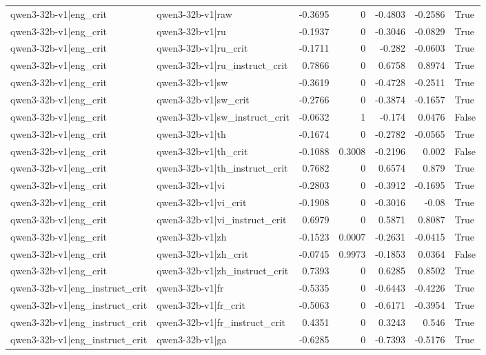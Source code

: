 \begin{table}
\begin{tabular}{l l r r r r l}
qwen3-32b-v1|eng_crit & qwen3-32b-v1|raw & -0.3695 & 0 & -0.4803 & -0.2586 & True \\
qwen3-32b-v1|eng_crit & qwen3-32b-v1|ru & -0.1937 & 0 & -0.3046 & -0.0829 & True \\
qwen3-32b-v1|eng_crit & qwen3-32b-v1|ru_crit & -0.1711 & 0 & -0.282 & -0.0603 & True \\
qwen3-32b-v1|eng_crit & qwen3-32b-v1|ru_instruct_crit & 0.7866 & 0 & 0.6758 & 0.8974 & True \\
qwen3-32b-v1|eng_crit & qwen3-32b-v1|sw & -0.3619 & 0 & -0.4728 & -0.2511 & True \\
qwen3-32b-v1|eng_crit & qwen3-32b-v1|sw_crit & -0.2766 & 0 & -0.3874 & -0.1657 & True \\
qwen3-32b-v1|eng_crit & qwen3-32b-v1|sw_instruct_crit & -0.0632 & 1 & -0.174 & 0.0476 & False \\
qwen3-32b-v1|eng_crit & qwen3-32b-v1|th & -0.1674 & 0 & -0.2782 & -0.0565 & True \\
qwen3-32b-v1|eng_crit & qwen3-32b-v1|th_crit & -0.1088 & 0.3008 & -0.2196 & 0.002 & False \\
qwen3-32b-v1|eng_crit & qwen3-32b-v1|th_instruct_crit & 0.7682 & 0 & 0.6574 & 0.879 & True \\
qwen3-32b-v1|eng_crit & qwen3-32b-v1|vi & -0.2803 & 0 & -0.3912 & -0.1695 & True \\
qwen3-32b-v1|eng_crit & qwen3-32b-v1|vi_crit & -0.1908 & 0 & -0.3016 & -0.08 & True \\
qwen3-32b-v1|eng_crit & qwen3-32b-v1|vi_instruct_crit & 0.6979 & 0 & 0.5871 & 0.8087 & True \\
qwen3-32b-v1|eng_crit & qwen3-32b-v1|zh & -0.1523 & 0.0007 & -0.2631 & -0.0415 & True \\
qwen3-32b-v1|eng_crit & qwen3-32b-v1|zh_crit & -0.0745 & 0.9973 & -0.1853 & 0.0364 & False \\
qwen3-32b-v1|eng_crit & qwen3-32b-v1|zh_instruct_crit & 0.7393 & 0 & 0.6285 & 0.8502 & True \\
qwen3-32b-v1|eng_instruct_crit & qwen3-32b-v1|fr & -0.5335 & 0 & -0.6443 & -0.4226 & True \\
qwen3-32b-v1|eng_instruct_crit & qwen3-32b-v1|fr_crit & -0.5063 & 0 & -0.6171 & -0.3954 & True \\
qwen3-32b-v1|eng_instruct_crit & qwen3-32b-v1|fr_instruct_crit & 0.4351 & 0 & 0.3243 & 0.546 & True \\
qwen3-32b-v1|eng_instruct_crit & qwen3-32b-v1|ga & -0.6285 & 0 & -0.7393 & -0.5176 & True \\

\end{tabular}
\end{table}
